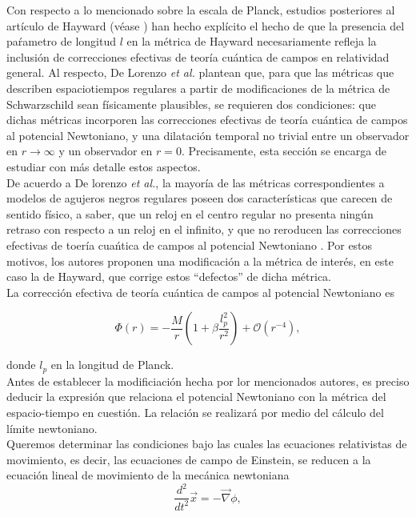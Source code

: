 \documentclass[16pt,a4paper]{article}
\numberwithin{equation}{section}
\theoremstyle{definition}
\begin{document}
Con respecto a lo mencionado sobre la escala de Planck, estudios posteriores al artículo de Hayward (véase \cite{lorenzo}) han hecho explícito el hecho de que la presencia del paŕametro de longitud $l$ en la métrica de Hayward necesariamente refleja la inclusión de correcciones efectivas de teoría cuántica de campos en relatividad general. Al respecto, De Lorenzo \emph{et al.} plantean que, para que las métricas que describen espaciotiempos regulares a partir de modificaciones de la métrica de Schwarzschild sean físicamente plausibles, se requieren dos condiciones: que dichas métricas incorporen las correcciones efectivas de teoría cuántica  de campos al potencial Newtoniano, y una dilatación temporal no trivial entre un observador en $r \to \infty$ y un observador en $r = 0$. Precisamente, esta sección se encarga de estudiar con más detalle estos aspectos.\\

De acuerdo a De lorenzo \emph{et al.}, la mayoría de las métricas correspondientes a modelos de agujeros negros regulares poseen dos características que carecen de sentido físico, a saber, que un reloj en el centro regular no presenta ningún retraso con respecto a un reloj en el infinito, y que no reroducen las correcciones efectivas de toería cuańtica de campos al potencial Newtoniano \cite{lorenzo}. Por estos motivos, los autores proponen una modificación a la métrica de interés, en este caso la de Hayward, que corrige estos ``defectos'' de dicha métrica.\\

La corrección efectiva de teoría cuántica de campos al potencial Newtoniano es

\begin{equation}
\label{newF}
\Phi (r) = -\frac{M}{r} \left( 1 + \beta \frac{l_{p}^2}{r^2} \right) + \mathcal{O}(r^{-4}),
\end{equation}

donde $l_{p}$ en la longitud de Planck.\\

Antes de establecer la modificiación hecha por lor mencionados autores, es preciso deducir la expresión que relaciona el potencial Newtoniano con la métrica del espacio-tiempo en cuestión. La relación se realizará por medio del cálculo del límite newtoniano.\\

Queremos determinar las condiciones bajo las cuales las ecuaciones relativistas de movimiento, es decir, las ecuaciones de campo de Einstein, se reducen a la ecuación lineal de movimiento de la mecánica newtoniana
\begin{equation*}
\frac{d^2}{dt^2}\vec{x} = - \vec{\nabla}\phi,
\end{equation*}
\end{document}
